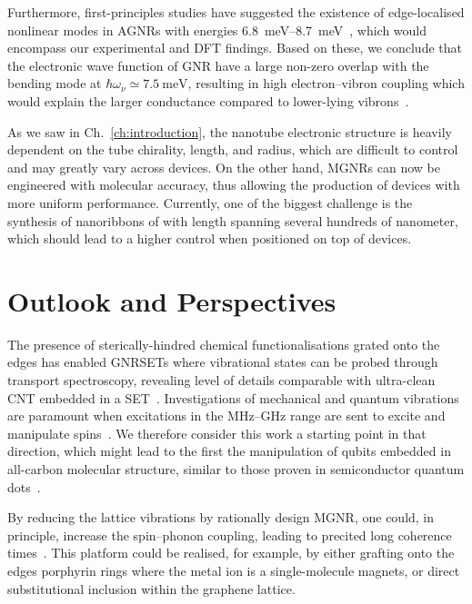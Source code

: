 %
Furthermore, first-principles studies have suggested the existence of edge-localised nonlinear modes in \glspl{AGNR} with energies \SIrange{6.8}{8.7}{\milli\electronvolt}~\cite{savin2016localized}, which would encompass our experimental and \gls{DFT} findings. Based on these, we conclude that the electronic wave function of \gls{GNR} have a large non-zero overlap with the bending mode at $\hbar\omega_\nu\simeq\SI{7.5}{\milli\electronvolt}$, resulting in high electron--vibron coupling which would explain the larger conductance compared to lower-lying vibrons~\cite{droth2011acoustic}.

As we saw in Ch.~\ref{ch:introduction}, the nanotube electronic structure is heavily dependent on the tube chirality, length, and radius, which are difficult to control and may greatly vary across devices. On the other hand, \glspl{MGNR} can now be engineered with molecular accuracy, thus allowing the production of devices with more uniform performance. Currently, one of the biggest challenge is the synthesis of nanoribbons of with length spanning several hundreds of nanometer, which should lead to a higher control when positioned on top of devices.

\section{Outlook and Perspectives}
The presence of sterically-hindred chemical functionalisations grated onto the edges has enabled \glspl{GNRSET} where vibrational states can be probed through transport spectroscopy, revealing level of details comparable with ultra-clean \gls{CNT} embedded in a \gls{SET}~\cite{sapmaz2005electronic,sapmaz2006tunneling}. Investigations of mechanical and quantum vibrations are paramount when excitations in the \si{\mega\hertz}--\si{\giga\hertz} range are sent to excite and manipulate spins~\cite{vincent2012electronic, gaita2019molecular, escalera2018spin}. We therefore consider this work a starting point in that direction, which might lead to the first the manipulation of qubits embedded in all-carbon molecular structure, similar to those proven in semiconductor quantum dots~\cite{hanson2007spins, burkard2021semiconductor}.

By reducing the lattice vibrations by rationally design \gls{MGNR}, one could, in principle, increase the spin--phonon coupling, leading to precited long coherence times~\cite{palyi2012spin}. This platform could be realised, for example, by either grafting onto the edges porphyrin rings where the metal ion is a single-molecule magnets, or direct substitutional inclusion within the graphene lattice.


